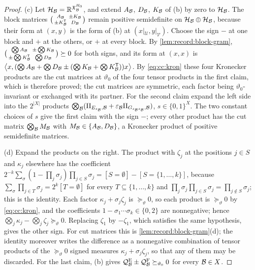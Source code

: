 \begin{proof}
(c) Let $\mathcal H_{\mathcal B}=\mathbb R^{\mathfrak X_{\mathcal B}^{H_0}}$, and extend $A_{\mathcal B}$,
$D_{\mathcal B}$, $K_{\mathcal B}$ of (b) by zero to $\mathcal H_{\mathcal B}$. The block matrices
$\bigl(\begin{smallmatrix}A_{\mathcal B}&\pm K_{\mathcal B}\\ \pm K_{\mathcal B}^{\mathsf T}&D_{\mathcal B}
\end{smallmatrix}\bigr)$ remain positive semidefinite on
$\mathcal H_{\mathcal B}\oplus\mathcal H_{\mathcal B}$, because their form at $(x,y)$ is the
form of (b) at $(x|_{\mathcal U},y|_{\mathcal V})$. Choose the sign $-$ at one
block and $+$ at the others, or $+$ at every block. By
\cref{lem:record:block-gram},
$\bigl(\begin{smallmatrix}\bigotimes A_{\mathcal B}&\pm\bigotimes K_{\mathcal B}\\
\pm\bigotimes K_{\mathcal B}^{\mathsf T}&\bigotimes D_{\mathcal B}\end{smallmatrix}\bigr)\succeq0$
for both signs, and its form at $(x,x)$ is
$\left\langle x,(\bigotimes A_{\mathcal B}+\bigotimes D_{\mathcal B}\pm(\bigotimes K_{\mathcal B}+\bigotimes
K_{\mathcal B}^{\mathsf T}))x\right\rangle$. By \eqref{eq:cc:kron} these four Kronecker products
are the cut matrices at $\vartheta_0$ of the four tensor products in the first
claim, which is therefore proved; the cut matrices are symmetric, each factor
being $\vartheta_0$-invariant or exchanged with its partner. For the second
claim expand the left side into the $2^{|X|}$ products
$\bigotimes_{\mathcal B}(\Pi_{E_{s_{\mathcal B}},\mathcal B}+\varepsilon_{\mathcal B}\Pi_{G_{s_{\mathcal B}s_{\mathcal B}},\mathcal B})$,
$s\in\{0,1\}^X$. The two constant choices of $s$ give the first claim with the
sign $-$; every other product has the cut matrix $\bigotimes_{\mathcal B}M_{\mathcal B}$
with $M_{\mathcal B}\in\{A_{\mathcal B},D_{\mathcal B}\}$, a Kronecker product of positive
semidefinite matrices.

(d) Expand the products on the right. The product with $\zeta_j$ at the
positions $j\in S$ and $\kappa_j$ elsewhere has the coefficient
$2^{-k}\sum_\sigma(1-\prod_j\sigma_j)\prod_{j\in S}\sigma_j=[S=\emptyset]-[S=\{1,\dots,k\}]$,
because $\sum_\sigma\prod_{j\in T}\sigma_j=2^k[T=\emptyset]$ for every
$T\subseteq\{1,\dots,k\}$ and $\prod_j\sigma_j\prod_{j\in S}\sigma_j=\prod_{j\notin S}\sigma_j$;
this is the identity. Each factor $\kappa_j+\sigma_j\zeta_j$ is
$\succeq_\vartheta0$, so each product is $\succeq_\vartheta0$ by \eqref{eq:cc:kron},
and the coefficients $1-\sigma_1\cdots\sigma_k\in\{0,2\}$ are nonnegative; hence
$\bigotimes_j\kappa_j-\bigotimes_j\zeta_j\succeq_\vartheta0$. Replacing $\zeta_1$ by
$-\zeta_1$, which satisfies the same hypothesis, gives the other sign. For cut
matrices this is \cref{lem:record:block-gram}(d); the identity moreover writes
the difference as a nonnegative combination of tensor products
of the $\succeq_\vartheta0$ signed measures
$\kappa_j+\sigma_j\zeta_j$, so that any of them may be discarded. For the last claim, (b) gives
$\mathcal Q^{\rm E}_\mathcal B\pm\mathcal Q^{\rm F}_\mathcal B\succeq_{\vartheta_0}0$ for every
$\mathcal B\in X$.
\end{proof}


